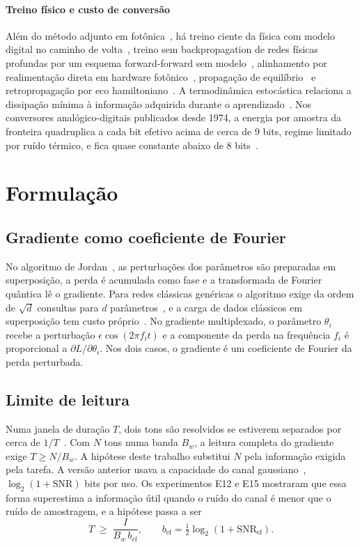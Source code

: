 \documentclass[journal]{IEEEtran}
\newcommand{\SNR}{\mathrm{SNR}}
\begin{document}
\paragraph*{Treino físico e custo de conversão} Além do método adjunto em fotônica~\cite{hughes2018,pai2023}, há treino ciente da física com modelo digital no caminho de volta~\cite{wright2022}, treino sem backpropagation de redes físicas profundas por um esquema forward-forward sem modelo~\cite{momeni2023}, alinhamento por realimentação direta em hardware fotônico~\cite{launay2020,filipovich2022}, propagação de equilíbrio~\cite{scellier2017} e retropropagação por eco hamiltoniano~\cite{lopezpastor2023}. A termodinâmica estocástica relaciona a dissipação mínima à informação adquirida durante o aprendizado~\cite{goldt2017}. Nos conversores analógico-digitais publicados desde 1974, a energia por amostra da fronteira quadruplica a cada bit efetivo acima de cerca de 9 bits, regime limitado por ruído térmico, e fica quase constante abaixo de 8 bits~\cite{jonsson2013,murmann_survey}.

\section{Formulação}
\label{sec:formulacao}

\subsection{Gradiente como coeficiente de Fourier}

No algoritmo de Jordan~\cite{jordan2005}, as perturbações dos parâmetros são preparadas em superposição, a perda é acumulada como fase e a transformada de Fourier quântica lê o gradiente. Para redes clássicas genéricas o algoritmo exige da ordem de $\sqrt{d}$ consultas para $d$ parâmetros~\cite{gilyen2019}, e a carga de dados clássicos em superposição tem custo próprio~\cite{jaques2023}. No gradiente multiplexado, o parâmetro $\theta_i$ recebe a perturbação $\epsilon\cos(2\pi f_i t)$ e a componente da perda na frequência $f_i$ é proporcional a $\partial L/\partial\theta_i$. Nos dois casos, o gradiente é um coeficiente de Fourier da perda perturbada.

\subsection{Limite de leitura}

Numa janela de duração $T$, dois tons são resolvidos se estiverem separados por cerca de $1/T$~\cite{gabor1946}. Com $N$ tons numa banda $B_w$, a leitura completa do gradiente exige $T \ge N/B_w$. A hipótese deste trabalho substitui $N$ pela informação exigida pela tarefa. A versão anterior usava a capacidade do canal gaussiano~\cite{shannon1948}, $\log_2(1+\SNR)$ bits por uso. Os experimentos E12 e E15 mostraram que essa forma superestima a informação útil quando o ruído do canal é menor que o ruído de amostragem, e a hipótese passa a ser
\begin{equation}
\label{eq:hipotese}
T \;\ge\; \frac{I}{B_w\, b_{\text{ef}}}, \qquad b_{\text{ef}} = \tfrac12\log_2\!\left(1+\SNR_{\text{ef}}\right).
\end{equation}
\end{document}
